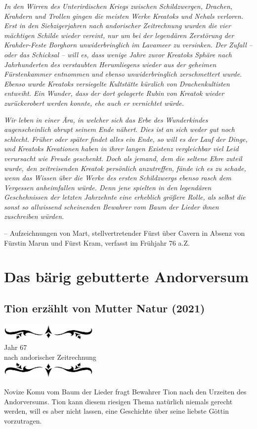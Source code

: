 \documentclass[10pt, a4paper, oneside]{book}
\newcommand{\az}[1]{%
    \begin{center}
        \includegraphics[width=180px]{Das Erbe des Wunderkindes/verzierung1.png}\\
        {\Huge #1} \\
        {nach andorischer Zeitrechnung}\\
        \includegraphics[width=180px]{Das Erbe des Wunderkindes/verzierung2.png}
    \end{center}
    \extramarks{}{#1 a.Z.}
}
\begin{document}
\textit{In den Wirren des Unterirdischen Kriegs zwischen Schildzwergen, Drachen, Krahdern und Trollen gingen die meisten Werke Kreatoks und Nehals verloren. Erst in den Siebzigerjahren nach andorischer Zeitrechnung wurden die vier mächtigen Schilde wieder vereint, nur um bei der legendären Zerstörung der Krahder-Feste Borghorn unwiderbringlich im Lavameer zu versinken. Der Zufall – oder das Schicksal – will es, dass wenige Jahre zuvor Kreatoks Sphäre nach Jahrhunderten des verstaubten Herumliegens wieder aus der geheimen Fürstenkammer entnommen und ebenso unwiderbringlich zerschmettert wurde. Ebenso wurde Kreatoks versiegelte Kultstätte kürzlich von Drachenkultisten entweiht. Ein Wunder, dass der dort gelagerte Rubin von Kreatok wieder zurückerobert werden konnte, ehe auch er vernichtet würde.}\bigskip

\textit{Wir leben in einer Ära, in welcher sich das Erbe des Wunderkindes augenscheinlich abrupt seinem Ende nähert. Dies ist an sich weder gut noch schlecht. Früher oder später findet alles ein Ende, so will es der Lauf der Dinge, und Kreatoks Kreationen haben in ihrer langen Existenz vergleichbar viel Leid verursacht wie Freude geschenkt. Doch als jemand, dem die seltene Ehre zuteil wurde, den zeitreisenden Kreatok persönlich anzutreffen, fände ich es zu schade, wenn das Wissen über die Werke des ersten Schildzwergs ebenso rasch dem Vergessen anheimfallen würde. Denn jene spielten in den legendären Geschehnissen der letzten Jahrzehnte eine erheblich größere Rolle, als selbst die sonst so allwissend scheinenden Bewahrer vom Baum der Lieder ihnen zuschreiben würden.}\bigskip

– Aufzeichnungen von Mart, stellvertretender Fürst über Cavern in Absenz von Fürstin Marun und Fürst Kram, verfasst im Frühjahr 76 a.Z.

\vspace*{\fill}

\newpage

 
\tableofcontents







\part{Das bärig gebutterte Andorversum}

\begin{chapterbox}
    \chapter{Tion erzählt von Mutter Natur (2021)}
    \label{Tion erzählt von Mutter Natur (2021)}
    \az{Jahr 67}
    Novize Komu vom Baum der Lieder fragt Bewahrer Tion nach den Urzeiten des Andorversums. Tion kann diesem riesigen Thema natürlich niemals gerecht werden, will es aber nicht lassen, eine Geschichte über seine liebste Göttin vorzutragen.
\end{chapterbox}
\end{document}
